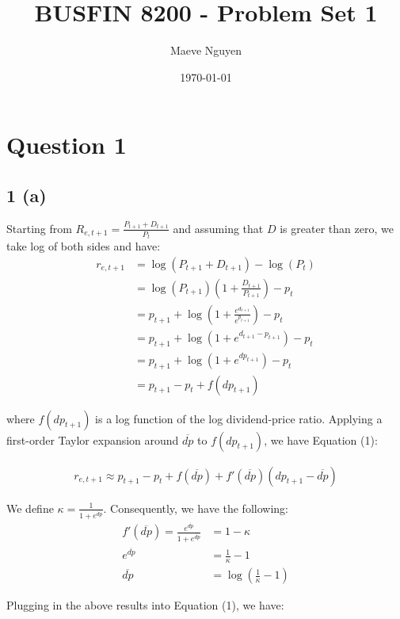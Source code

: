 \documentclass[11pt]{article}
\title{BUSFIN 8200 - Problem Set 1}
\author{Maeve Nguyen}
\date{\today}
\begin{document}
\maketitle
\section*{Question 1}
\subsection*{1 (a)}

Starting from $R_{e,t+1} = \frac{P_{t+1} + D_{t+1}}{P_t}$ and assuming that $D$ is greater than zero, we take log of both sides and have:
\[
\begin{aligned}
  r_{e,t+1}
  &= \log(P_{t+1} + D_{t+1}) - \log(P_t) \\
  &= \log(P_{t+1})(1+\frac{D_{t+1}}{P_{t+1}}) -  p_t \\
  &= p_{t+1} + \log(1+ \frac{e^{d_{t+1}}}{e^{p_{t+1}}}) - p_t \\
  &= p_{t+1} + \log(1+ e^{d_{t+1} - p_{t+1}}) - p_t \\
  &= p_{t+1} + \log(1+ e^{dp_{t+1}}) - p_t \\
  &= p_{t+1} - p_t + f(dp_{t+1})
\end{aligned}
\]

where $f(dp_{t+1})$ is a log function of the log dividend-price ratio. Applying a first-order Taylor expansion around $\overline{dp}$ to $f(dp_{t+1})$, we have Equation (1):

\[
\begin{aligned}
    r_{e,t+1}
    \approx p_{t+1} - p_t + f(\overline{dp})+f'(\overline{dp})(dp_{t+1} - \overline{dp}) 
\end{aligned}
\]

We define $\kappa = \frac{1}{1+e^{\overline{dp}}}$. Consequently, we have the following: 
\[
\begin{aligned}
     f'(\overline{dp}) = \frac{e^{\overline{dp}}}{1+e^{\overline{dp}}} &= 1 - \kappa \\
    e^{\overline{dp}} &= \frac{1}{\kappa} - 1 \\
    \overline{dp} &= \log(\frac{1}{\kappa} - 1)
\end{aligned}
\]

Plugging in the above results into Equation (1), we have:
\end{document}
